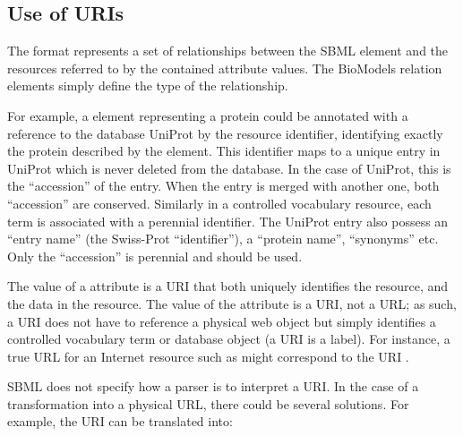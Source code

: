 \subsection{Use of URIs}
\label{sec:uri-in-annotation}

The format represents a set of relationships between the SBML
element and the resources referred to by the contained
 attribute values.  The BioModels relation
elements simply define the type of the relationship.

For example, a \Species element representing a protein could be
annotated with a reference to the database UniProt by the
 resource identifier,
identifying exactly the protein described by the \Species element.
This identifier maps to a unique entry in UniProt which is never
deleted from the database. In the case of UniProt, this is the
``accession'' of the entry. When the entry is merged with another
one, both ``accession'' are conserved. Similarly in a controlled
vocabulary resource, each term is associated with a perennial
identifier. The UniProt entry also possess an ``entry name'' (the
Swiss-Prot ``identifier''), a ``protein name'', ``synonyms'' etc.
Only the ``accession'' is perennial and should be used.

The value of a  attribute is a URI that both
uniquely identifies the resource, and the data in the resource. 
The value of the  attribute is a URI, not a
URL; as such, a URI does not have to reference a physical web
object but simply identifies a controlled vocabulary term or
database object (a URI is a label). For instance, a true URL for an Internet
resource such as  might
correspond to the URI .

\begin{blockChanged}

SBML does not specify how a parser is to interpret a URI. In the
case of a transformation into a physical URL, there could be
several solutions. For example, the URI
 can be translated
into:

\end{blockChanged}

\noindent {}\\
\noindent {}\\
\noindent {}


